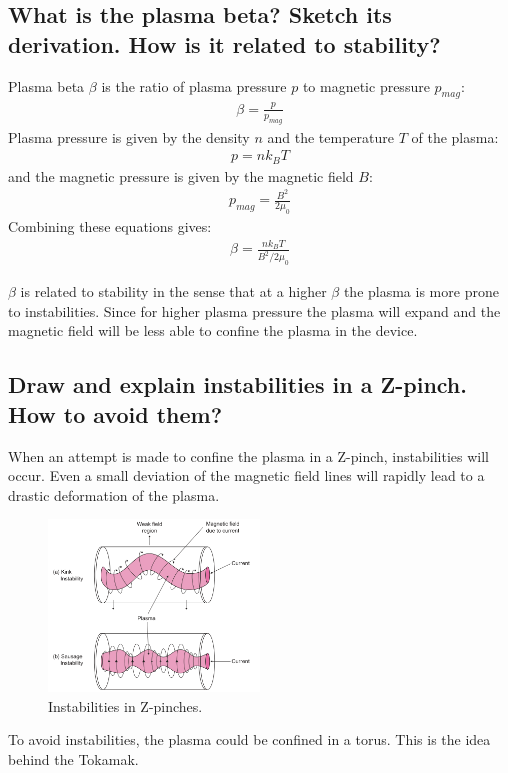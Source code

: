 \subsection{What is the plasma beta? Sketch its derivation. How is it related to stability?}
\begin{multisolutionblock}
Plasma beta $\beta$ is the ratio of plasma pressure $p$ to magnetic pressure $p_{mag}$:
\begin{align}
    \beta = \frac{p}{p_{mag}}
\end{align}
Plasma pressure is given by the density $n$ and the temperature $T$ of the plasma: 
\begin{align}
    p = n k_B T
\end{align}
and the magnetic pressure is given by the magnetic field $B$:
\begin{align}
    p_{mag} = \frac{B^2}{2 \mu_0}
\end{align}
Combining these equations gives:
\begin{align}
    \beta = \frac{n k_B T}{B^2 / 2 \mu_0}
\end{align}

$\beta$ is related to stability in the sense that at a higher $\beta$ the plasma is more prone to instabilities. Since for higher plasma pressure the plasma will expand and the magnetic field will be less able to confine the plasma in the device. 
\end{multisolutionblock}

\subsection{Draw and explain instabilities in a Z-pinch. How to avoid them?}
\begin{multisolutionblock}
When an attempt is made to confine the plasma in a Z-pinch, instabilities will occur. Even a small deviation of the magnetic field lines will rapidly lead to a drastic deformation of the plasma.
\begin{figure}[H]
    \centering
    \includegraphics[width=0.5\textwidth]{chapters/fig/5_instabilities.png}
    \caption{Instabilities in Z-pinches.}
    \label{fig:z_pinch_instability}
\end{figure}
To avoid instabilities, the plasma could be confined in a torus. This is the idea behind the Tokamak.
\end{multisolutionblock}

